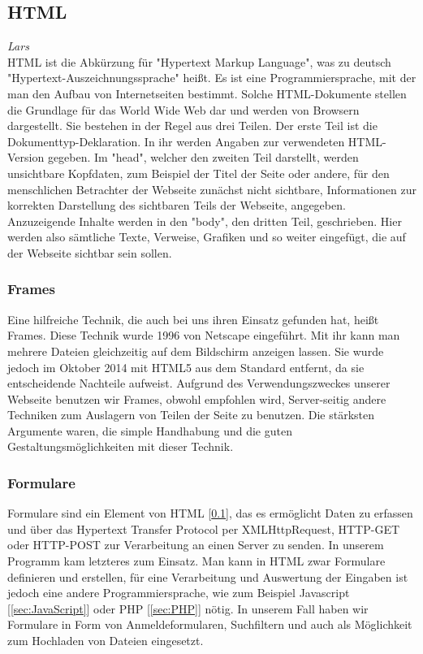 \documentclass[12pt,a4paper,bibliography=totocnumbered,listof=totocnumbered]{scrartcl}
\begin{document}
\subsection{HTML}
\label{sec:HTML}
\emph{Lars}\\
HTML ist die Abkürzung für "Hypertext Markup Language", was zu deutsch "Hypertext-Auszeichnungssprache" heißt. Es ist eine Programmiersprache, mit der man den Aufbau von Internetseiten bestimmt. Solche HTML-Dokumente stellen die Grundlage für das World Wide Web dar und werden von Browsern dargestellt.\cite{HTML}\cite{Hypertext_Markup_Language} Sie bestehen in der Regel aus drei Teilen.\cite{HTML/Dokumentstruktur_und_Aufbau} Der erste Teil ist die Dokumenttyp-Deklaration. In ihr werden Angaben zur verwendeten HTML-Version gegeben. Im "head", welcher den zweiten Teil darstellt, werden unsichtbare Kopfdaten, zum Beispiel der Titel der Seite oder andere, für den menschlichen Betrachter der Webseite zunächst nicht sichtbare, Informationen zur korrekten Darstellung des sichtbaren Teils der Webseite, angegeben.\cite{HTML/Kopfdaten} Anzuzeigende Inhalte werden in den "body", den dritten Teil, geschrieben. Hier werden also sämtliche Texte, Verweise, Grafiken und so weiter eingefügt, die auf der Webseite sichtbar sein sollen.\cite{HTML/Dokumentstruktur_und_Aufbau}

\subsubsection{Frames}
Eine hilfreiche Technik, die auch bei uns ihren Einsatz gefunden hat, heißt Frames. Diese Technik wurde 1996 von Netscape eingeführt. Mit ihr kann man mehrere Dateien gleichzeitig auf dem Bildschirm anzeigen lassen.\cite{HTML/Frames} Sie wurde jedoch im Oktober 2014 mit HTML5\cite{HTML5} aus dem Standard entfernt, da sie entscheidende Nachteile aufweist. Aufgrund des Verwendungszweckes unserer Webseite benutzen wir Frames, obwohl empfohlen wird, Server-seitig andere Techniken zum Auslagern von Teilen der Seite zu benutzen.\cite{HTML/Frames} Die stärksten Argumente waren, die simple Handhabung und die guten Gestaltungsmöglichkeiten mit dieser Technik.

\subsubsection{Formulare}
\label{sec:Formulare}
Formulare sind ein Element von HTML [\ref{sec:HTML}], das es ermöglicht Daten zu erfassen und über das Hypertext Transfer Protocol per XMLHttpRequest, HTTP-GET oder HTTP-POST zur Verarbeitung an einen Server zu senden.\cite{Webformular} In unserem Programm kam letzteres zum Einsatz. Man kann in HTML zwar Formulare definieren und erstellen, für eine Verarbeitung und Auswertung der Eingaben ist jedoch eine andere Programmiersprache, wie zum Beispiel Javascript [\ref{sec:JavaScript}] oder PHP [\ref{sec:PHP}] nötig.\cite{HTML/Formulare/Form} In unserem Fall haben wir Formulare in Form von Anmeldeformularen, Suchfiltern und auch als Möglichkeit zum Hochladen von Dateien eingesetzt.
\end{document}
